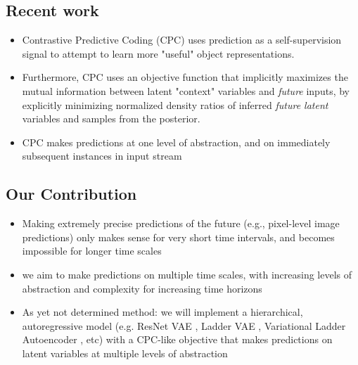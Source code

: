 \documentclass{article}
\begin{document}
\subsection*{Recent work}
\begin{itemize}
  \item Contrastive Predictive Coding (CPC) \cite{Oord2018} uses prediction as a self-supervision signal to attempt to learn more "useful" object representations.
  \item Furthermore, CPC uses an objective function that implicitly maximizes the mutual information between latent "context" variables and \emph{future} inputs, by explicitly minimizing normalized density ratios of inferred \emph{future latent} variables and samples from the posterior.
  \item CPC makes predictions at one level of abstraction, and on immediately subsequent instances in input stream
\end{itemize}
\subsection*{Our Contribution}
\begin{itemize}
  \item Making extremely precise predictions of the future (e.g., pixel-level image predictions) only makes sense for very short time intervals, and becomes impossible for longer time scales
  \item we aim to make predictions on multiple time scales, with increasing levels of abstraction and complexity for increasing time horizons
  \item As yet not determined method: we will implement a hierarchical, autoregressive model (e.g. ResNet VAE \cite{Kingma2016}, Ladder VAE \cite{Sonderby2016}, Variational Ladder Autoencoder \cite{Zhao2017}, etc) with a CPC-like objective that makes predictions on latent variables at multiple levels of abstraction
\end{itemize}
\end{document}
